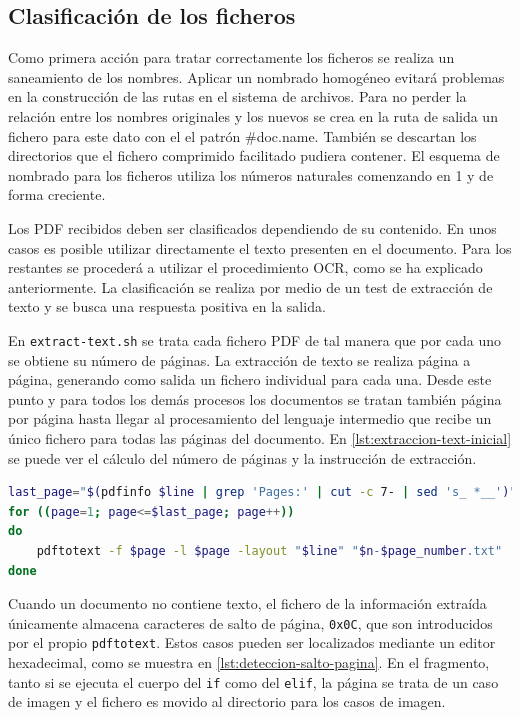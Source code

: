 
\subsection{Clasificación de los ficheros}

Como primera acción para tratar correctamente los ficheros se realiza un saneamiento de los nombres. Aplicar un nombrado homogéneo evitará problemas en la construcción de las rutas en el sistema de archivos. Para no perder la relación entre los nombres originales y los nuevos se crea en la ruta de salida un fichero para este dato con el el patrón \#doc.name. También se descartan los directorios que el fichero comprimido facilitado pudiera contener. El esquema de nombrado para los ficheros utiliza los números naturales comenzando en 1 y de forma creciente.

Los PDF recibidos deben ser clasificados dependiendo de su contenido. En unos casos es posible utilizar directamente el texto presenten en el documento. Para los restantes se procederá a utilizar el procedimiento OCR, como se ha explicado anteriormente. La clasificación se realiza por medio de un test de extracción de texto y se busca una respuesta positiva en la salida.

En \verb|extract-text.sh| se trata cada fichero PDF de tal manera que por cada uno se obtiene su número de páginas. La extracción de texto se realiza página a página, generando como salida un fichero individual para cada una. Desde este punto y para todos los demás procesos los documentos se tratan también página por página hasta llegar al procesamiento del lenguaje intermedio que recibe un único fichero para todas las páginas del documento. En \ref{lst:extraccion-text-inicial} se puede ver el cálculo del número de páginas y la instrucción de extracción.

\begin{lstlisting}[language=bash,caption={Extracción tentativa del texto},label=lst:extraccion-text-inicial]
last_page="$(pdfinfo $line | grep 'Pages:' | cut -c 7- | sed 's_ *__')"
for ((page=1; page<=$last_page; page++))
do
    pdftotext -f $page -l $page -layout "$line" "$n-$page_number.txt"
done
\end{lstlisting}

Cuando un documento no contiene texto, el fichero de la información extraída únicamente almacena caracteres de salto de página, \verb|0x0C|, que son introducidos por el propio \verb|pdftotext|. Estos casos pueden ser localizados mediante un editor hexadecimal, como se muestra en \ref{lst:deteccion-salto-pagina}. En el fragmento, tanto si se ejecuta el cuerpo del \verb|if| como del \verb|elif|, la página se trata de un caso de imagen y el fichero es movido al directorio para los casos de imagen.

